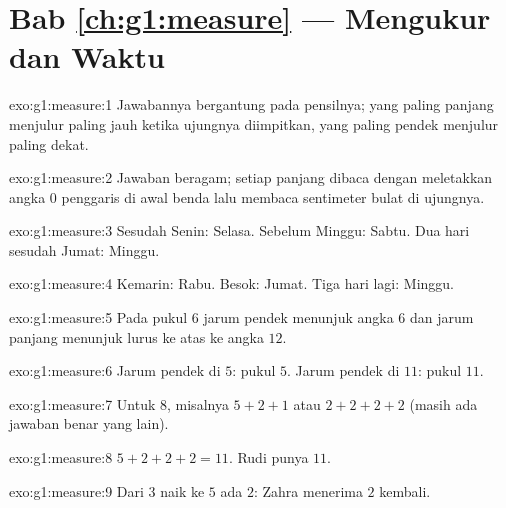 \section*{Bab \ref{ch:g1:measure} --- Mengukur dan Waktu}

\begin{solution}{exo:g1:measure:1}
Jawabannya bergantung pada pensilnya; yang paling panjang menjulur
paling jauh ketika ujungnya diimpitkan, yang paling pendek menjulur
paling dekat.
\end{solution}

\begin{solution}{exo:g1:measure:2}
Jawaban beragam; setiap panjang dibaca dengan meletakkan angka $0$
penggaris di awal benda lalu membaca sentimeter bulat di ujungnya.
\end{solution}

\begin{solution}{exo:g1:measure:3}
Sesudah Senin: Selasa. Sebelum Minggu: Sabtu. Dua hari sesudah
Jumat: Minggu.
\end{solution}

\begin{solution}{exo:g1:measure:4}
Kemarin: Rabu. Besok: Jumat. Tiga hari lagi: Minggu.
\end{solution}

\begin{solution}{exo:g1:measure:5}
Pada pukul $6$ jarum pendek menunjuk angka $6$ dan jarum panjang
menunjuk lurus ke atas ke angka $12$.
\end{solution}

\begin{solution}{exo:g1:measure:6}
Jarum pendek di $5$: pukul $5$. Jarum pendek di $11$: pukul $11$.
\end{solution}

\begin{solution}{exo:g1:measure:7}
Untuk $8$, misalnya $5 + 2 + 1$ atau $2 + 2 + 2 + 2$ (masih ada
jawaban benar yang lain).
\end{solution}

\begin{solution}{exo:g1:measure:8}
$5 + 2 + 2 + 2 = 11$. Rudi punya $11$.
\end{solution}

\begin{solution}{exo:g1:measure:9}
Dari $3$ naik ke $5$ ada $2$: Zahra menerima $2$ kembali.

\end{solution}
